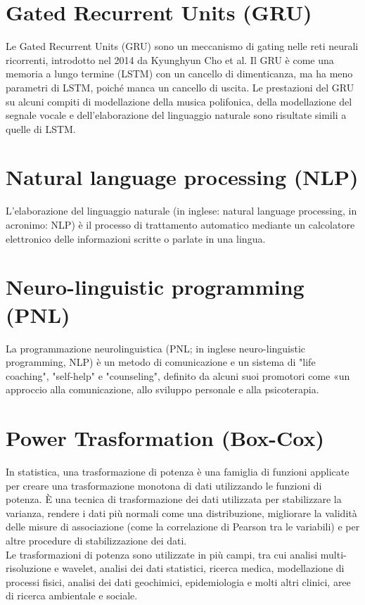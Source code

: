\documentclass[12pt,a4paper]{report}
\begin{document}
\section*{Gated Recurrent Units (GRU)}
\label{appendix:GRU}
Le Gated Recurrent Units (GRU) sono un meccanismo di gating nelle reti neurali ricorrenti, introdotto nel 2014 da Kyunghyun Cho et al. Il GRU è come una memoria a lungo termine (LSTM) con un cancello di dimenticanza, ma ha meno parametri di LSTM, poiché manca un cancello di uscita. Le prestazioni del GRU su alcuni compiti di modellazione della musica polifonica, della modellazione del segnale vocale e dell'elaborazione del linguaggio naturale sono risultate simili a quelle di LSTM.

\section*{Natural language processing (NLP)}
\label{appendix:NLP}
L'elaborazione del linguaggio naturale (in inglese: natural language processing, in acronimo: NLP) è il processo di trattamento automatico mediante un calcolatore elettronico delle informazioni scritte o parlate in una lingua.

\section*{Neuro-linguistic programming (PNL)}
\label{appendix:PNL}
La programmazione neurolinguistica (PNL; in inglese neuro-linguistic programming, NLP) è un metodo di comunicazione e un sistema di "life coaching", "self-help" e "counseling", definito da alcuni suoi promotori come «un approccio alla comunicazione, allo sviluppo personale e alla psicoterapia.

\section*{Power Trasformation (Box-Cox)}
\label{appendix:Box-Cox}
In statistica, una trasformazione di potenza è una famiglia di funzioni applicate per creare una trasformazione monotona di dati utilizzando le funzioni di potenza. È una tecnica di trasformazione dei dati utilizzata per stabilizzare la varianza, rendere i dati più normali come una distribuzione, migliorare la validità delle misure di associazione (come la correlazione di Pearson tra le variabili) e per altre procedure di stabilizzazione dei dati.\\
Le trasformazioni di potenza sono utilizzate in più campi, tra cui analisi multi-risoluzione e wavelet, analisi dei dati statistici, ricerca medica, modellazione di processi fisici, analisi dei dati geochimici, epidemiologia e molti altri clinici, aree di ricerca ambientale e sociale.
\end{document}
